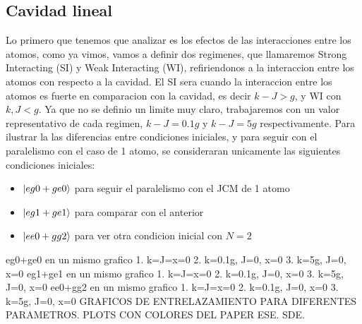 \subsection{Cavidad lineal}
Lo primero que tenemos que analizar es los efectos de las interacciones entre los atomos, como ya vimos,  vamos a definir dos regimenes, que llamaremos Strong Interacting (SI) y Weak Interacting (WI), refiriendonos a la interaccion entre los atomos con respecto a la cavidad. El SI sera cuando la interaccion entre los atomos es fuerte en comparacion con la cavidad, es decir $k-J>g$, y WI con $k,J<g$. Ya que no se definio un limite muy claro, trabajaremos con un valor representativo de cada regimen, $k-J=0.1g$ y $k-J=5g$ respectivamente. Para ilustrar la las diferencias entre condiciones iniciales, y para seguir con el paralelismo con el caso de 1 atomo, se consideraran unicamente las siguientes condiciones iniciales:
\begin{itemize}
    \item $\ket{eg0+ge0}$ para seguir el paralelismo con el JCM de 1 atomo \\
    \item $\ket{eg1+ge1}$ para comparar con el anterior \\
    \item $\ket{ee0+gg2}$ para ver otra condicion inicial con $N=2$ \\
\end{itemize}

eg0+ge0 en un mismo grafico
1. k=J=x=0 
2. k=0.1g, J=0, x=0
3. k=5g, J=0, x=0
eg1+ge1 en un mismo grafico
1. k=J=x=0 
2. k=0.1g, J=0, x=0
3. k=5g, J=0, x=0
ee0+gg2 en un mismo grafico
1. k=J=x=0 
2. k=0.1g, J=0, x=0
3. k=5g, J=0, x=0
GRAFICOS DE ENTRELAZAMIENTO PARA DIFERENTES PARAMETROS. PLOTS CON COLORES DEL PAPER ESE. SDE. 
